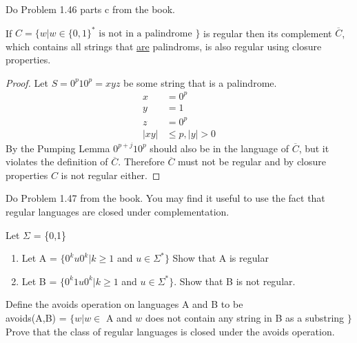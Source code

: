 \begin{problem}{4}
  Do Problem 1.46 parts c from the book.
  \begin{solution}
    If $C = \{ w|w \in \{ 0,1 \}^* \text{ is not in a palindrome }\}$ is regular then its complement $\overline{C}$, which contains
    all strings that \underline{are} palindroms, is also regular using closure properties.
    \begin{proof}
      Let $S = 0^p10^p = xyz$ be some string that is a palindrome. \\
      \begin{align*}
        x &= 0^p \\
        y &= 1 \\
        z &= 0^p \\
        |xy| &\le p, |y| > 0
      \end{align*}
      By the Pumping Lemma $0^{p+j}10^p$ should also be in the language of $\overline{C}$, but it violates the definition of
      $\overline{C}$. Therefore $\overline{C}$ must not be regular and by closure properties $C$ is not regular either.
    \end{proof}
  \end{solution}
\end{problem}

\begin{problem}{5}
  Do Problem 1.47 from the book. You may find it useful to use the fact that regular languages are closed under complementation.
\end{problem}

\begin{problem}{6}
  Let $\Sigma$ = \{0,1\}
  \begin{enumerate}
    \item Let A = $\{ 0^ku0^k | k \ge 1$ and $u \in \Sigma^* \}$ Show that A is regular \\
    \item Let B = $\{ 0^k1u0^k | k \ge 1$ and $u \in \Sigma^* \}$. Show that B is not regular.
  \end{enumerate}
\end{problem}

\begin{problem}{7}
  Define the avoids operation on languages A and B to be \\
  \newline\indent avoids(A,B) = $\{ w | w \in$ A and $w$ does not contain any string in B as a substring $\}$ \\
  \newline Prove that the class of regular languages is closed under the avoids operation.
\end{problem}



